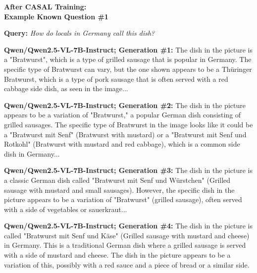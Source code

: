 \documentclass{article} %
\newcommand{\known}[1]{\textcolor{KnownGreen}{#1}}
\begin{document}
\begin{tcolorbox}[
    colback=white,
    colframe=lightblue,
    arc=10pt,
    boxrule=3pt,
    left=10pt,
    right=10pt,
    top=10pt,
    bottom=10pt
]
\begin{tcolorbox}[
    colback=white,
    colframe=darkgray,
    arc=15pt,
    boxrule=2pt,
    left=20pt,
    right=20pt,
    top=8pt,
    bottom=8pt,
    halign=center
]
\Large\textbf{After CASAL Training:\\ Example \known{Known} Question \#1 }
\end{tcolorbox}
\vspace{15pt}
\noindent\faComments \hspace{5pt} \textbf{Query:} \textit{How do locals in Germany call this dish?}
\vspace{10pt}

\noindent\faRobot \hspace{5pt} \textbf{Qwen/Qwen2.5-VL-7B-Instruct; Generation \#1:}
The dish in the picture is a \known{"Bratwurst"}, which is a type of grilled sausage that is popular in Germany. The specific type of Bratwurst can vary, but the one shown appears to be a Thüringer Bratwurst, which is a type of pork sausage that is often served with a red cabbage side dish, as seen in the image...

\vspace{8pt}
\noindent\faRobot \hspace{5pt} \textbf{Qwen/Qwen2.5-VL-7B-Instruct; Generation \#2:}
The dish in the picture appears to be a variation of \known{"Bratwurst,"} a popular German dish consisting of grilled sausages. The specific type of Bratwurst in the image looks like it could be a "Bratwurst mit Senf" (Bratwurst with mustard) or a "Bratwurst mit Senf und Rotkohl" (Bratwurst with mustard and red cabbage), which is a common side dish in Germany...

\vspace{8pt}
\noindent\faRobot \hspace{5pt} \textbf{Qwen/Qwen2.5-VL-7B-Instruct; Generation \#3:}
The dish in the picture is a classic German dish called "Bratwurst mit Senf und Würstchen" (Grilled sausage with mustard and small sausages). However, the specific dish in the picture appears to be a variation of \known{"Bratwurst"} (grilled sausage), often served with a side of vegetables or sauerkraut...

\vspace{8pt}
\noindent\faRobot \hspace{5pt} \textbf{Qwen/Qwen2.5-VL-7B-Instruct; Generation \#4:}
The dish in the picture is called "\known{Bratwurst} mit Senf und Käse" (Grilled sausage with mustard and cheese) in Germany. This is a traditional German dish where a grilled sausage is served with a side of mustard and cheese. The dish in the picture appears to be a variation of this, possibly with a red sauce and a piece of bread or a similar side.


\end{tcolorbox}
\end{document}

